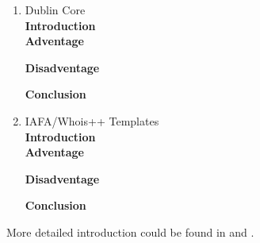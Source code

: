 \documentclass[a4paper]{article} %
\begin{document}
\begin{enumerate}
\begin{enumerate}
	\end{enumerate}	
	{\bf Disadventage}
	\begin{enumerate}
		
	\end{enumerate}
	{\bf Conclusion}\\
	
	\item Dublin Core\\
	{\bf Introduction}\\
	
	{\bf Adventage}
	\begin{enumerate}
		
	\end{enumerate}	
	{\bf Disadventage}
	\begin{enumerate}
		
	\end{enumerate}
	{\bf Conclusion}\\
	
	\item IAFA/Whois++ Templates\\
	{\bf Introduction}\\
	
	{\bf Adventage}
	\begin{enumerate}
		
	\end{enumerate}	
	{\bf Disadventage}
	\begin{enumerate}
		
	\end{enumerate}
	{\bf Conclusion}\\	
	
\end{enumerate}

More detailed introduction could be found in {\bf\cite{1:1:1}} and {\bf\cite{Rachel:2009:reviewofmetadataformats}}.

\end{document}
